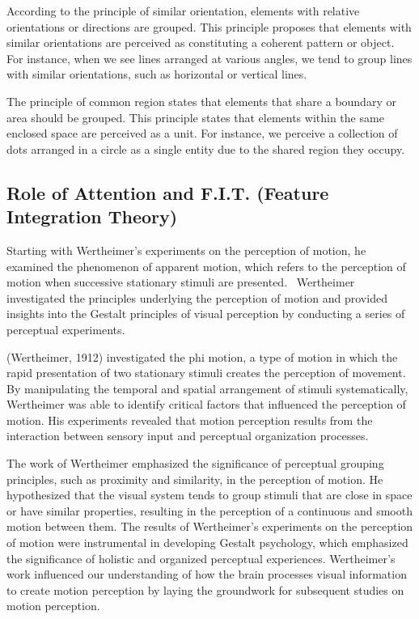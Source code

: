 \documentclass[print]{nuthesis}
\begin{document}
According to the principle of similar orientation, elements with relative orientations or directions are grouped.
This principle proposes that elements with similar orientations are perceived as constituting a coherent pattern or object.
For instance, when we see lines arranged at various angles, we tend to group lines with similar orientations, such as horizontal or vertical lines.

The principle of common region states that elements that share a boundary or area should be grouped.
This principle states that elements within the same enclosed space are perceived as a unit.
For instance, we perceive a collection of dots arranged in a circle as a single entity due to the shared region they occupy.

\hypertarget{role-of-attention-and-f.i.t.-feature-integration-theory}{%
\subsection{Role of Attention and F.I.T. (Feature Integration Theory)}\label{role-of-attention-and-f.i.t.-feature-integration-theory}}

Starting with Wertheimer's experiments on the perception of motion, he examined the phenomenon of apparent motion, which refers to the perception of motion when successive stationary stimuli are presented.~
Wertheimer investigated the principles underlying the perception of motion and provided insights into the Gestalt principles of visual perception by conducting a series of perceptual experiments.

(Wertheimer, 1912) investigated the phi motion, a type of motion in which the rapid presentation of two stationary stimuli creates the perception of movement.
By manipulating the temporal and spatial arrangement of stimuli systematically, Wertheimer was able to identify critical factors that influenced the perception of motion.
His experiments revealed that motion perception results from the interaction between sensory input and perceptual organization processes.

The work of Wertheimer emphasized the significance of perceptual grouping principles, such as proximity and similarity, in the perception of motion.
He hypothesized that the visual system tends to group stimuli that are close in space or have similar properties, resulting in the perception of a continuous and smooth motion between them.
The results of Wertheimer's experiments on the perception of motion were instrumental in developing Gestalt psychology, which emphasized the significance of holistic and organized perceptual experiences.
Wertheimer's work influenced our understanding of how the brain processes visual information to create motion perception by laying the groundwork for subsequent studies on motion perception.
\end{document}
